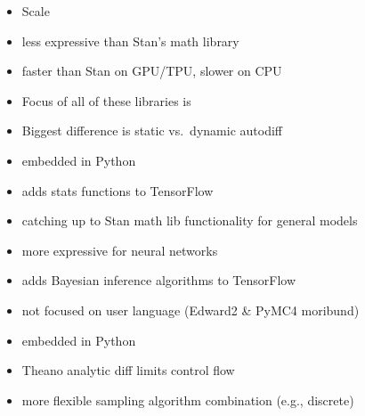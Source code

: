 \documentclass[9pt]{report}
\begin{document}
\begin{itemize}
\item Scale
\end{itemize}
  
\begin{itemize}
\item less expressive than Stan's math library
\item faster than Stan on GPU/TPU, slower on CPU
\item Focus of all of these libraries is
\item Biggest difference is static vs.\ dynamic autodiff
\end{itemize}

\begin{itemize}
\item embedded in Python
\item adds stats functions to TensorFlow
\item catching up to Stan math lib functionality for general models
\item more expressive for neural networks
\item adds Bayesian inference algorithms to TensorFlow
\item not focused on user language (Edward2 \& PyMC4 moribund)
\end{itemize}

\begin{itemize}
\item embedded in Python
\item Theano analytic diff limits control flow
\item more flexible sampling algorithm combination (e.g., discrete)
\end{itemize}
\end{document}
